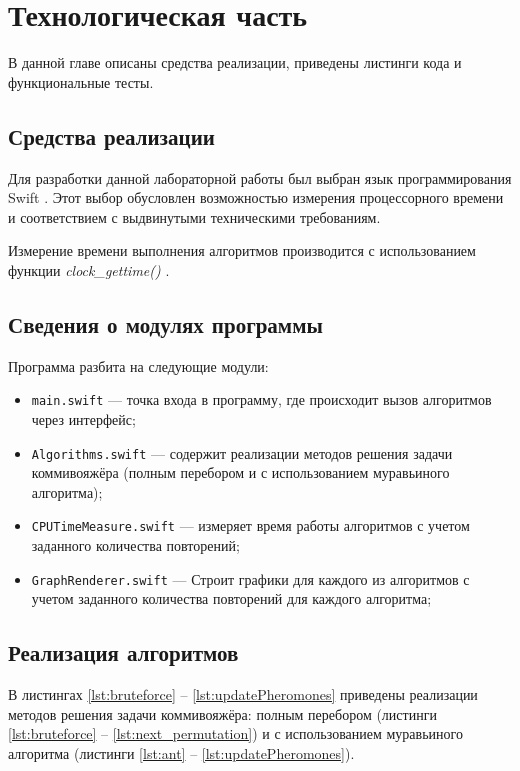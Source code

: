 \chapter{Технологическая часть}

В данной главе описаны средства реализации, приведены листинги кода и функциональные тесты.

\section{Средства реализации}

Для разработки данной лабораторной работы был выбран язык программирования Swift \cite{swift}. 
Этот выбор обусловлен возможностью измерения процессорного времени \cite{cpu-time-measure} и соответствием с выдвинутыми техническими требованиям.

Измерение времени выполнения алгоритмов производится с использованием функции \textit{clock\_gettime()} \cite{cpu-time-measure}.
\clearpage
\section{Сведения о модулях программы}

Программа разбита на следующие модули:

\begin{itemize}
	\item \texttt{main.swift} --- точка входа в программу, где происходит вызов алгоритмов через интерфейс;
	\item \texttt{Algorithms.swift} --- содержит реализации методов решения задачи коммивояжёра (полным перебором и с использованием муравьиного алгоритма);
	\item \texttt{CPUTimeMeasure.swift} --- измеряет время работы алгоритмов с учетом заданного количества повторений;
	\item \texttt{GraphRenderer.swift} --- Строит графики для каждого из алгоритмов с учетом заданного количества повторений для каждого алгоритма;
\end{itemize}

\section{Реализация алгоритмов}

В листингах \ref{lst:bruteforce} -- \ref{lst:updatePheromones} приведены реализации методов решения задачи коммивояжёра: полным перебором (листинги \ref{lst:bruteforce} -- \ref{lst:next_permutation}) и с использованием муравьиного алгоритма (листинги \ref{lst:ant} -- \ref{lst:updatePheromones}).

